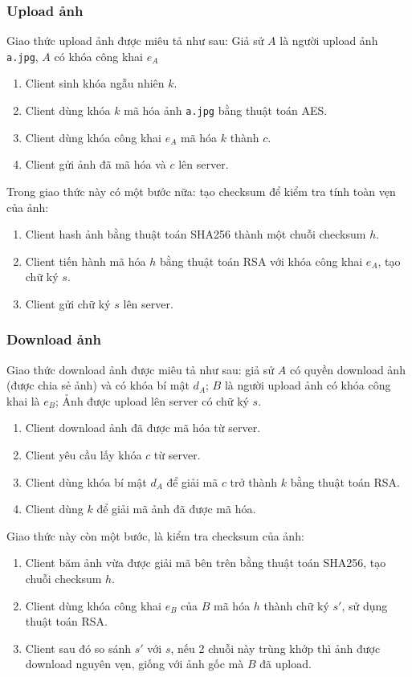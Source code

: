 \documentclass[12pt]{article}
\begin{document}
\subsubsection{Upload ảnh}
Giao thức upload ảnh được miêu tả như sau: Giả sử $A$ là người upload ảnh \texttt{a.jpg}, $A$ có khóa công khai $e_A$
\begin{enumerate}
\item Client sinh khóa ngẫu nhiên $k$.
\item Client dùng khóa $k$ mã hóa ảnh \texttt{a.jpg} bằng thuật toán AES.
\item Client dùng khóa công khai $e_A$ mã hóa $k$ thành $c$.
\item Client gửi ảnh đã mã hóa và $c$ lên server.
\end{enumerate}
Trong giao thức này có một bước nữa: tạo checksum để kiểm tra tính  toàn vẹn của ảnh:
\begin{enumerate}
\item Client hash ảnh bằng thuật toán SHA256 thành một chuỗi checksum $h$.
\item Client tiến hành mã hóa $h$ bằng thuật toán RSA với khóa công khai $e_A$, tạo chữ ký $s$.
\item Client gửi chữ ký $s$ lên server.
\end{enumerate}

\subsubsection{Download ảnh}
Giao thức download ảnh được miêu tả như sau: giả sử $A$ có quyền download ảnh (được chia sẻ ảnh) và có khóa bí mật $d_A$; $B$ là người upload ảnh có khóa công khai là $e_B$; Ảnh được upload lên server có chữ ký $s$.
\begin{enumerate}
\item Client download ảnh đã được mã hóa từ server.
\item Client yêu cầu lấy khóa $c$ từ server.
\item Client dùng khóa bí mật $d_A$ để giải mã $c$ trở thành $k$ bằng thuật toán RSA.
\item Client dùng $k$ để giải mã ảnh đã được mã hóa.
\end{enumerate}
Giao thức này còn một bước, là kiểm tra checksum của ảnh:
\begin{enumerate}
\item Client băm ảnh vừa được giải mã bên trên bằng thuật toán SHA256, tạo chuỗi checksum $h$.
\item Client dùng khóa công khai $e_B$ của $B$ mã hóa $h$ thành chữ ký $s'$, sử dụng thuật toán RSA.
\item Client sau đó so sánh $s'$ với $s$, nếu 2 chuỗi này trùng khớp thì ảnh được download nguyên vẹn, giống với ảnh gốc mà $B$ đã upload.
\end{enumerate}
\end{document}
